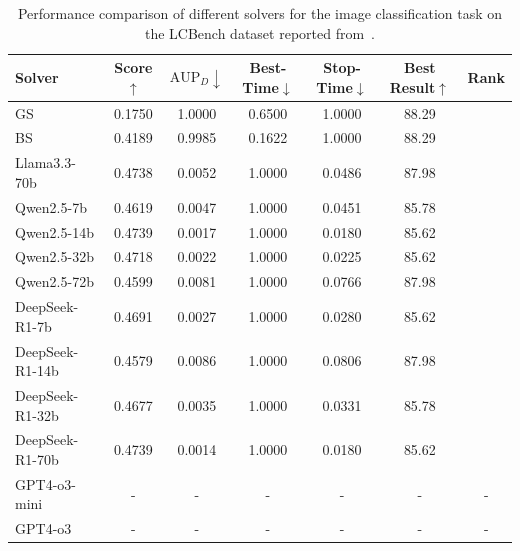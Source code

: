 \begin{table}[h]
    \centering
    \setlength{\tabcolsep}{3pt}
    \renewcommand\arraystretch{1.5}
    \caption{Performance comparison of different solvers for the image classification task on the LCBench dataset reported from~\cite{zimmer2021auto}.}
        \begin{tabular}{l|cccccc}
        \toprule
        Solver           & Score$\uparrow$ & $\text{AUP}_D\downarrow$ & Best-Time$\downarrow$ & Stop-Time$\downarrow$ & Best Result$\uparrow$ & Rank \\
        \midrule
        GS & 0.1750 & 1.0000 & 0.6500 & 1.0000 & 88.29 \\
        BS & 0.4189 & 0.9985 & 0.1622 & 1.0000 & 88.29 \\
        Llama3.3-70b & 0.4738 & 0.0052 & 1.0000 & 0.0486 & 87.98 \\
        Qwen2.5-7b & 0.4619 & 0.0047 & 1.0000 & 0.0451 & 85.78 \\
        Qwen2.5-14b & 0.4739 & 0.0017 & 1.0000 & 0.0180 & 85.62 \\
        Qwen2.5-32b & 0.4718 & 0.0022 & 1.0000 & 0.0225 & 85.62 \\
        Qwen2.5-72b & 0.4599 & 0.0081 & 1.0000 & 0.0766 & 87.98 \\
        DeepSeek-R1-7b & 0.4691 & 0.0027 & 1.0000 & 0.0280 & 85.62 \\
        DeepSeek-R1-14b & 0.4579 & 0.0086 & 1.0000 & 0.0806 & 87.98 \\
        DeepSeek-R1-32b & 0.4677 & 0.0035 & 1.0000 & 0.0331 & 85.78 \\
        DeepSeek-R1-70b & 0.4739 & 0.0014 & 1.0000 & 0.0180 & 85.62 \\
        GPT4-o3-mini & - & - & - & - & - & - \\
        GPT4-o3 & - & - & - & - & - & - \\
        \bottomrule
    \end{tabular}
    \label{tab:LCBenchmark}
\end{table}





